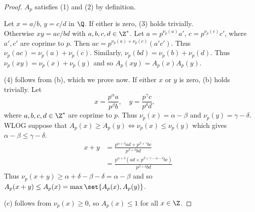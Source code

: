 \documentclass[12pt]{article}
\begin{document}
\begin{proof}
    $A_p$ satisfies (1) and (2) by definition.

    Let $x = a/b$, $y = c/d$ in $\Q$.
    If either is zero, (3) holds trivially. \\
    Otherwise $xy = ac/bd$ with $a, b, c, d \in \Z^*$.
    Let $a = p^{\nu_p(a)} a'$, $c = p^{\nu_p(c)} c'$, where $a', c'$ are
    coprime to $p$.
    Then $ac = p^{\nu_p(a) + \nu_p(c)} (a'c')$.
    Thus $\nu_p(ac) = \nu_p(a) + \nu_p(c)$.
    Similarly, $\nu_p(bd) = \nu_p(b) + \nu_p(d)$.
    Thus $\nu_p(xy) = \nu_p(x) + \nu_p(y)$ and so $A_p(xy) = A_p(x) A_p(y)$.

    (4) follows from (b), which we prove now.
    If either $x$ or $y$ is zero, (b) holds trivially.
    Let \[
        x = \frac{p^\alpha a}{p^\beta b}, \quad
        y = \frac{p^\gamma c}{p^\delta d}, \quad
    \] where $a, b, c, d \in \Z^*$ are coprime to $p$.
    Thus $\nu_p(x) = \alpha - \beta$ and $\nu_p(y) = \gamma - \delta$.
    WLOG suppose that $A_p(x) \ge A_p(y) \iff \nu_p(x) \le \nu_p(y)$ which gives
    $\alpha - \beta \le \gamma - \delta$.
    \begin{align*}
        x + y &= \frac{p^{\alpha + \delta} ad + p^{\beta + \gamma} bc}{p^{\beta + \delta} bd} \\
        &= \frac{p^{\alpha + \delta} (ad + p^{\beta + \gamma - \alpha - \delta} bc)}{p^{\beta + \delta} bd}
    \end{align*}
    Thus $\nu_p(x + y) \ge \alpha + \delta - \beta - \delta = \alpha - \beta$
    and so $A_p(x + y) \le A_p(x) = \max\set{A_p(x), A_p(y)}$.

    (c) follows from $\nu_p(x) \ge 0$, so $A_p(x) \le 1$ for all $x \in \Z$.
\end{proof}
\end{document}
